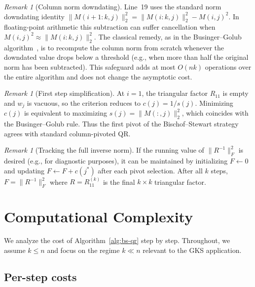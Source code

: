 \documentclass[11pt]{article}
\theoremstyle{definition}
\theoremstyle{remark}
\newtheorem{remark}[theorem]{Remark}
\newcommand{\fnorm}[1]{\lVert #1 \rVert_F}
\newcommand{\tnorm}[1]{\lVert #1 \rVert_2}
\begin{document}
\begin{remark}[Column norm downdating]\label{rem:downdate}
Line~19 uses the standard norm downdating identity
$\tnorm{M(i{+}1:k,j)}^2 = \tnorm{M(i:k,j)}^2 - M(i,j)^2$.  In
floating-point arithmetic this subtraction can suffer cancellation
when $M(i,j)^2 \approx \tnorm{M(i:k,j)}^2$.  The classical remedy,
as in the Businger--Golub
algorithm~\cite{businger_linear_least_squares}, is to recompute the
column norm from scratch whenever the downdated value drops below a
threshold (e.g., when more than half the original norm has been
subtracted).  This safeguard adds at most $O(nk)$ operations over the
entire algorithm and does not change the asymptotic cost.
\end{remark}

\begin{remark}[First step simplification]\label{rem:first-step}
At $i = 1$, the triangular factor $R_{11}$ is empty and $w_j$ is
vacuous, so the criterion reduces to $c(j) = 1/s(j)$.  Minimizing
$c(j)$ is equivalent to maximizing $s(j) = \tnorm{M(:,j)}^2$, which
coincides with the Businger--Golub rule.  Thus the first pivot of the
Bischof--Stewart strategy agrees with standard column-pivoted QR\@.
\end{remark}

\begin{remark}[Tracking the full inverse norm]\label{rem:track-frob}
If the running value of $\fnorm{R^{-1}}^2$ is desired (e.g., for
diagnostic purposes), it can be maintained by initializing $F \gets 0$
and updating $F \gets F + c(j^*)$ after each pivot selection.  After
all $k$ steps, $F = \fnorm{R^{-1}}^2$ where $R = R_{11}^{(k)}$ is
the final $k \times k$ triangular factor.
\end{remark}

\section{Computational Complexity}
\label{sec:complexity}

We analyze the cost of Algorithm~\ref{alg:bs-qr} step by step.
Throughout, we assume $k \leq n$ and focus on the regime $k \ll n$
relevant to the GKS application.

\subsection{Per-step costs}
\end{document}
